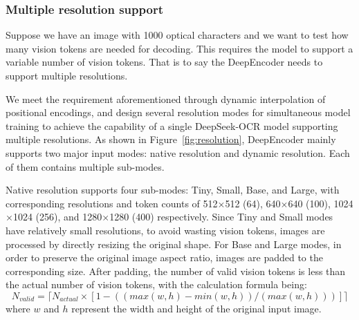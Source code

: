 \documentclass[11pt, a4paper, logo, copyright, nonumbering]{deepseek}
\begin{document}
\begin{CJK*}{UTF8}{gbsn}
\begin{table}[!h]
{\begin{tabular}{lcccc|cc}
			\bottomrule		
	\end{tabular}}	

	\label{table1}
\end{table}

\subsubsection{Multiple resolution support}
Suppose we have an image with 1000 optical characters and we want to test how many vision tokens are needed for decoding. This requires the model to support a variable number of vision tokens. That is to say the DeepEncoder needs to support multiple resolutions. 


We meet the requirement aforementioned through dynamic interpolation of positional encodings, and design several resolution modes for simultaneous model training to achieve the capability of a single DeepSeek-OCR model supporting multiple resolutions. As shown in Figure~\ref{fig:resolution}, DeepEncoder mainly supports two major input modes: native resolution and dynamic resolution. Each of them contains multiple sub-modes.

Native resolution supports four sub-modes: Tiny, Small, Base, and Large, with corresponding resolutions and token counts of 512$\times$512 (64), 640$\times$640 (100), 1024$\times$1024 (256), and 1280$\times$1280 (400) respectively. Since Tiny and Small modes have relatively small resolutions, to avoid wasting vision tokens, images are processed by directly resizing the original shape. For Base and Large modes, in order to preserve the original image aspect ratio, images are padded to the corresponding size. After padding, the number of valid vision tokens is less than the actual number of vision tokens, with the calculation formula being:
\begin{equation}
N_{valid} = \lceil N_{actual} \times [1 - ((max(w, h) - min(w, h)) / (max(w, h)))] \rceil
\label{enq1}
\end{equation}
where $w$ and $h$ represent the width and height of the original input image.


\end{CJK*}
\end{document}
